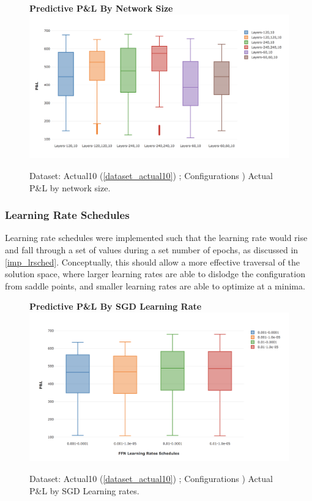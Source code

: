 \documentclass[a4paper,11pt,oneside]{article}
\theoremstyle{plain}
\theoremstyle{definition}
\begin{document}
\begin{figure}[H]
	\centering 
	\textbf{Predictive P\&L By Network Size}
	\includegraphics[scale=0.35]{images/results/network/ffn_pl_network_size.png} 
	\caption{Dataset: Actual10 (\ref{dataset_actual10}) ; Configurations )
		\newline Actual P\&L by network size.}
	\label{figure-results_ffn_size_agl}
\end{figure}

\subsubsection{Learning Rate Schedules}

Learning rate schedules were implemented such that the learning rate would rise and fall through a set of values during a set number of epochs, as discussed in \ref{imp_lrsched}.	Conceptually, this should allow a more effective traversal of the solution space, where larger learning rates are able to dislodge the configuration from saddle points, and smaller learning rates are able to optimize at a minima. \newline

\begin{figure}[H]
	\centering 
	\textbf{Predictive P\&L By SGD Learning Rate}
	\includegraphics[scale=0.35]{images/results/network/sgd_lr_pl.png} 
	\caption{Dataset: Actual10 (\ref{dataset_actual10}) ; Configurations )
		\newline Actual P\&L by SGD Learning rates.}
	\label{figure-sgd_lr}
\end{figure}
\end{document}
